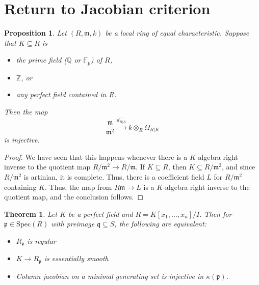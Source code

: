 \documentclass{amsart}[12pt]
\newcommand{\Spec}{\mathrm{Spec}}
\newcommand{\Q}{\mathbb{Q}}
\newcommand{\F}{\mathbb{F}}
\newcommand{\Z}{\mathbb{Z}}
\newcommand{\fp}{{\mathfrak p}}
\newcommand{\fm}{{\mathfrak m}}
\newcommand{\fq}{{\mathfrak q}}
\numberwithin{equation}{section}
\theoremstyle{plain} %
\newtheorem{thm}[equation]{Theorem}
\newtheorem{prop}[equation]{Proposition}
\theoremstyle{definition}
\theoremstyle{remark}
\newcommand{\xra}[1]{\xrightarrow{#1}}
\begin{document}
\section{Return to Jacobian criterion}



\begin{prop} Let $(R,\fm,k)$ be a local ring of equal characteristic. Suppose that $K \subseteq R$ is
\begin{itemize}
\item the prime field ($\Q$ or $\F_p$) of $R$,
\item $\Z$, or
\item any perfect field contained in $R$.
\end{itemize}
Then the map
\[ \frac{\fm}{\fm^2} \xra{\overline{d_{R|K}}} k \otimes_R \Omega_{R|K} \]
is injective.
\end{prop}
\begin{proof} We have seen that this happens whenever there is a $K$-algebra right inverse to the quotient map $R/\fm^2 \to R/\fm$. If $K\subseteq R$, then $K\subseteq R/\fm^2$, and since $R/\fm^2$ is artinian, it is complete. Thus, there is a coefficient field $L$ for $R/\fm^2$ containing $K$. Thus, the map from $R\fm \to L$ is a $K$-algebra right inverse to the quotient map, and the conclusion follows.
\end{proof}

\begin{thm} Let $K$ be a perfect field and $R=K[x_1,\dots,x_n]/I$. Then for $\fp\in \Spec(R)$ with preimage $\fq\subseteq S$, the following are equivalent:
\begin{itemize}
\item $R_\fp$ is regular
\item $K\to R_\fp$ is essentially smooth
\item Column jacobian on a minimal generating set is injective in $\kappa(\fp)$.
\end{itemize}
\end{thm}
\end{document}

